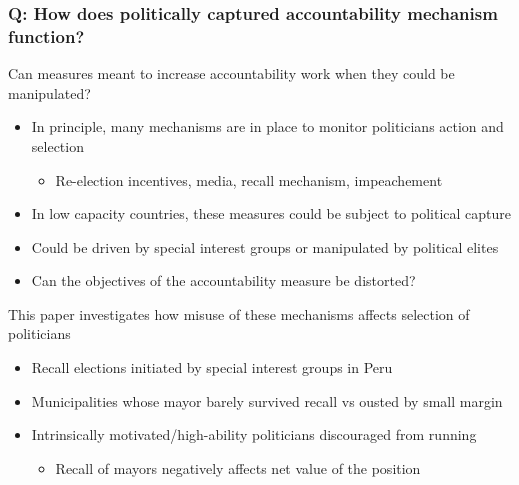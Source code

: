 \documentclass[aspectratio=169]{beamer}
\begin{document}
\begin{frame}
  \frametitle{Q: How does politically captured accountability mechanism function?}
Can measures meant to increase accountability work when they could be manipulated?
\begin{itemize}\setlength\itemsep{3pt}
\item In principle, many mechanisms are in place to monitor politicians action and selection
\begin{itemize}\setlength\itemsep{3pt}
\item Re-election incentives, media, recall mechanism, impeachement
\end{itemize}
\item In low capacity countries, these measures could be subject to political capture
\item Could be driven by special interest groups or manipulated by political elites
\item Can the objectives of the accountability measure be distorted?
\end{itemize}\medskip
This paper investigates how misuse of these mechanisms affects selection of politicians
\begin{itemize}\setlength\itemsep{3pt}
\item Recall elections initiated by special interest groups in Peru
\item Municipalities whose mayor barely survived recall vs ousted by small margin
\item Intrinsically motivated/high-ability politicians discouraged from running 
\begin{itemize}\setlength\itemsep{3pt}
\item Recall of mayors negatively affects net value of the position
\end{itemize}
\end{itemize}
\end{frame}
\end{document}
